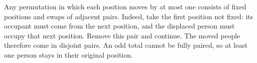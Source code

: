 Any permutation in which each position moves by at most one consists of fixed positions and swaps of adjacent pairs. Indeed, take the first position not fixed: its occupant must come from the next position, and the displaced person must occupy that next position. Remove this pair and continue. The moved people therefore come in disjoint pairs. An odd total cannot be fully paired, so at least one person stays in their original position.
